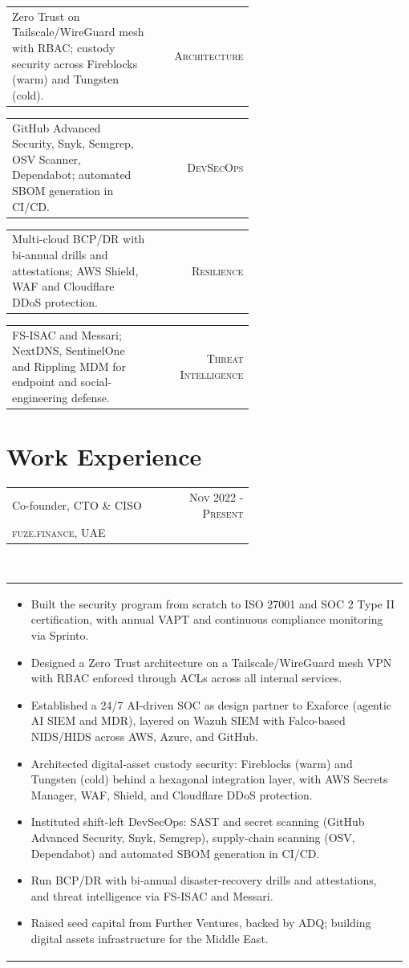 \documentclass[a4paper]{article} %
\newcommand{\verticalspacing}{-0.25cm}
\newcommand{\bulletspace}{0.7cm}
\newcommand{\projectheadspacing}{6.9cm}
\newcommand{\cproject}[5]{%
    \begin{tabular}{p{0.60\linewidth}r}
        \textcolor{NavyBlue}{\small #2} & \multicolumn{1}{m{ \projectheadspacing{} }}{\raggedleft \small {\textsc{#1}}}\\
        \small {#3} & \small {#4}
    \end{tabular}\\
    \begin{tabular}{p{0.98\linewidth}}
    \vspace{-0.3cm}
        \small{#5}
    \end{tabular}
    \vspace{\verticalspacing{}}
}
\newcommand{\skill}[2]{%
    \begin{tabular}{p{0.60\linewidth}r}
        \small {#2} & \multicolumn{1}{m{ \projectheadspacing{} }}{\raggedleft \textsc{\small #1}}\\
    \end{tabular}
    \vspace{\verticalspacing{}}
}
\begin{document}
\skill
    {Architecture}
    {Zero Trust on Tailscale/WireGuard mesh with RBAC; custody security across Fireblocks (warm) and Tungsten (cold).}

\skill
    {DevSecOps}
    {GitHub Advanced Security, Snyk, Semgrep, OSV Scanner, Dependabot; automated SBOM generation in CI/CD.}

\skill
    {Resilience}
    {Multi-cloud BCP/DR with bi-annual drills and attestations; AWS Shield, WAF and Cloudflare DDoS protection.}

\skill
    {Threat Intelligence}
    {FS-ISAC and Messari; NextDNS, SentinelOne and Rippling MDM for endpoint and social-engineering defense.}


\section{Work Experience}

\cproject
      {Nov 2022 - Present}
      {Co-founder, CTO \& CISO}
      {\textsc{fuze.finance}, UAE}
      {}
      {%
        \begin{itemize}[leftmargin=\bulletspace{}]
            \item Built the security program from scratch to ISO 27001 and SOC 2 Type II
                certification, with annual VAPT and continuous compliance monitoring
                via Sprinto.
            \item Designed a Zero Trust architecture on a Tailscale/WireGuard mesh VPN
                with RBAC enforced through ACLs across all internal services.
            \item Established a 24/7 AI-driven SOC as design partner to Exaforce (agentic
                AI SIEM and MDR), layered on Wazuh SIEM with Falco-based NIDS/HIDS
                across AWS, Azure, and GitHub.
            \item Architected digital-asset custody security: Fireblocks (warm) and
                Tungsten (cold) behind a hexagonal integration layer, with AWS
                Secrets Manager, WAF, Shield, and Cloudflare DDoS protection.
            \item Instituted shift-left DevSecOps: SAST and secret scanning (GitHub
                Advanced Security, Snyk, Semgrep), supply-chain scanning (OSV,
                Dependabot) and automated SBOM generation in CI/CD.
            \item Run BCP/DR with bi-annual disaster-recovery drills and attestations,
                and threat intelligence via FS-ISAC and Messari.
            \item Raised seed capital from Further Ventures, backed by ADQ; building
                digital assets infrastructure for the Middle East.
        \end{itemize}
      }
\end{document}
